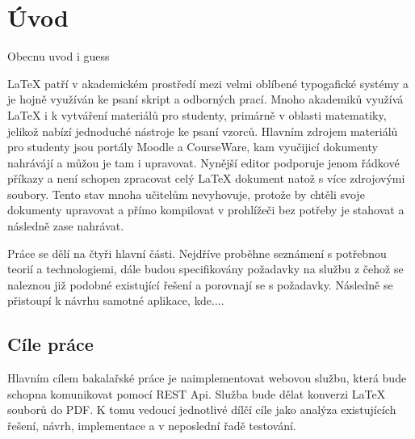 \chapter{Úvod}
Obecnu uvod i guess

LaTeX patří v akademickém prostředí mezi velmi oblíbené typogafické systémy a je hojně využíván ke psaní skript a odborných prací. Mnoho akademiků využívá LaTeX i k vytváření materiálů pro studenty, primárně v oblasti matematiky, jelikož nabízí jednoduché nástroje ke psaní vzorců. Hlavním zdrojem materiálů pro studenty jsou portály Moodle a CourseWare, kam vyučijicí dokumenty nahrávájí a můžou je tam i upravovat. Nynější editor podporuje jenom řádkové příkazy a není schopen zpracovat celý LaTeX dokument natož s více zdrojovými soubory. Tento stav mnoha učitelům nevyhovuje, protože by chtěli svoje dokumenty upravovat a přímo kompilovat v prohlížeči bez potřeby je stahovat a následně zase nahrávat. 

Práce se dělí na čtyři hlavní části. Nejdříve proběhne seznámení s potřebnou teorií a technologiemi, dále budou specifikovány požadavky na službu z čehož se naleznou již podobné existující řešení a porovnají se s požadavky. Následně se přistoupí k návrhu samotné aplikace, kde.... 


\section{Cíle práce}
Hlavním cílem bakalařské práce je naimplementovat webovou službu, která bude schopna komunikovat pomocí REST Api. Služba bude dělat konverzi LaTeX souborů do PDF. K tomu vedoucí jednotlivé dílčí cíle jako analýza existujících řešení, návrh, implementace a v neposlední řadě testování. 
